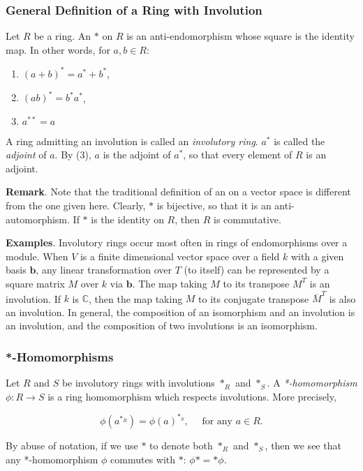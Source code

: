 \documentclass[12pt]{article}
\begin{document}
\subsubsection*{General Definition of a Ring with Involution}
Let $R$ be a ring.  An \emph{} $*$ on $R$ is an anti-endomorphism whose square is the identity map.  In other words, for $a,b\in R$:

\begin{enumerate}
\item $(a+b)^*=a^*+b^*$,
\item $(ab)^*=b^*a^*$,
\item $a^{**}=a$
\end{enumerate}

A ring admitting an involution is called an \emph{involutory ring}.  $a^*$ is called the \emph{adjoint} of $a$.  By (3), $a$ is the adjoint of $a^*$, so that every element of $R$ is an adjoint.  

\textbf{Remark}.  Note that the traditional definition of an  on a vector space is different from the one given here.  Clearly, $*$ is bijective, so that it is an anti-automorphism.  If $*$ is the identity on $R$, then $R$ is commutative.

\textbf{Examples}.  Involutory rings occur most often in rings of endomorphisms over a module.  When $V$ is a finite dimensional vector space over a field $k$ with a given basis $\boldsymbol{b}$, any linear transformation over $T$ (to itself) can be represented by a square matrix $M$ over $k$ via $\boldsymbol{b}$.  The map taking $M$ to its transpose $M^T$ is an involution.  If $k$ is $\mathbb{C}$, then the map taking $M$ to its conjugate transpose $\overline{M}^T$ is also an involution.  In general, the composition of an isomorphism and an involution is an involution, and the composition of two involutions is an isomorphism.

\subsubsection*{*-Homomorphisms}  Let $R$ and $S$ be involutory rings with involutions $*_R$ and $*_S$.  A \emph{*-homomorphism} $\phi:R\to S$ is a ring homomorphism which respects involutions.  More precisely,

$$\phi(a^{*_R})=\phi(a)^{*_S},\quad\mbox{ for any }a\in R.$$

By abuse of notation, if we use $*$ to denote both $*_R$ and $*_S$, then we see that any *-homomorphism $\phi$ commutes with $*$: $\phi*=*\phi$.
\end{document}

